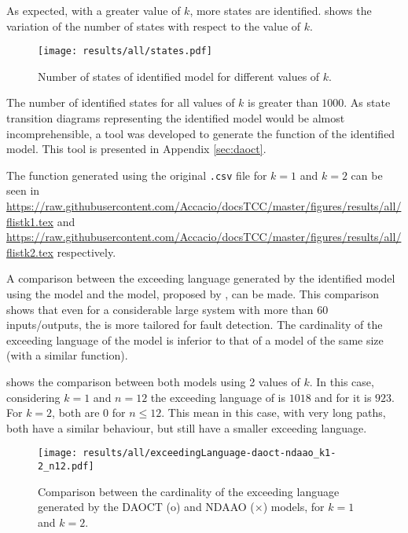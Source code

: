 As expected, with a greater value of $k$, more states are identified. 
 shows the variation of the number of
states with respect to the value of $k$.
\begin{figure}[H]
  \centering
  \texttt{[image: results/all/states.pdf]}
  \caption{Number of states of identified model for different values of $k$.}
    \label{fig:statesIdentOriginal}
\end{figure}

The number of identified states for all values of $k$ is greater than $1000$. As
state transition diagrams representing the identified model would be almost
incomprehensible, a tool was developed to generate the \ffunction{} function of
the identified model. This tool is presented in Appendix \ref{sec:daoct}.

The \ffunction{} function generated using the original \verb|.csv| file
for $k=1$ and $k=2$
can be seen in  
\url{https://raw.githubusercontent.com/Accacio/docsTCC/master/figures/results/all/flistk1.tex}
and
\url{https://raw.githubusercontent.com/Accacio/docsTCC/master/figures/results/all/flistk2.tex}
respectively.

A comparison between the exceeding language generated by the
identified model using the \DAOCT{} model and the \NDAAO{} model, proposed by
\cite{klein2005fault}, can be made. This comparison shows that even for a considerable
large system with more than 60 inputs\slash outputs, the \DAOCT{} is more
tailored for fault detection. The cardinality of the exceeding language of the
\DAOCT{} model is
inferior to that of a \NDAAO{} model of the same size (with a similar \ffunction{} function).

 shows the comparison between both models using 2 values of $k$.
In this case, considering $k=1$ and $n=12$ the
exceeding language of \NDAAO{} is $1018$ and for \DAOCT{} it is $923$. For $k=2$, both are $0$ for $n\leq12$. This mean in this case, with very
long paths, both have a similar behaviour, but \DAOCT{} still have a smaller exceeding language.
\begin{figure}[H]
  \centering
  \texttt{[image: results/all/exceedingLanguage-daoct-ndaao\_k1-2\_n12.pdf]}
  \caption[Comparison between the cardinality of the exceeding language generated by the DAOCT and
NDAAO.]{Comparison between the cardinality of the exceeding language generated by the DAOCT (o) and
NDAAO ($\times$) models, for $k=1$ and $k=2$.}
    \label{fig:daoctNdaaoOriginal}
\end{figure}

